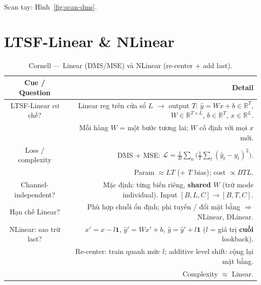 \documentclass[12pt,a4paper]{article}
\newcommand{\cornellhead}{%
  \toprule
  \textbf{Cue / Question} & \textbf{Detail} \\
  \midrule
}
\begin{document}
\noindent Scan tay: Hình~\ref{fig:scan-dms}.

\section{LTSF-Linear \& NLinear}

\begin{table}[H]
  \centering
  \caption{Cornell --- Linear (DMS/MSE) và NLinear (re-center + add last).}
  \label{tab:cornell-linear-nlinear}
  \small
  \begin{tabularx}{\textwidth}{@{}CD@{}}
    \cornellhead
    LTSF-Linear cơ chế?    &
    Linear reg trên cửa sổ \(L\) $\to$ output \(T\):
    \(\hat{y}=Wx+b\in\mathbb{R}^{T}\),
    \(W\in\mathbb{R}^{T\times L}\), \(b\in\mathbb{R}^{T}\), \(x\in\mathbb{R}^{L}\).                     \\
                           & Mỗi hàng \(W\) = một bước tương lai; \(W\) cố định với mọi \(x\) mới.      \\
    \addlinespace
    Loss / complexity      &
    DMS + MSE:
    \(\mathcal{L}=\frac{1}{B}\sum_n\bigl(\frac{1}{T}\sum_t(\hat{y}_t-y_t)^2\bigr)\).                    \\
                           & Param \(\approx LT\) (+ \(T\) bias); cost \(\propto BTL\).                 \\
    \addlinespace
    Channel-independent?   &
    Mặc định: từng biến riêng, \textbf{shared \(W\)}
    (trừ mode individual). Input \([B,L,C]\to[B,T,C]\).                                                 \\
    \addlinespace
    Hạn chế Linear?        &
    Phù hợp chuỗi ổn định; phi tuyến / đổi mặt bằng $\Rightarrow$ NLinear, DLinear.                     \\
    \addlinespace
    NLinear: sao trừ last? &
    \(x'=x-l\mathbf{1}\), \(\hat{y}'=Wx'+b\), \(\hat{y}=\hat{y}'+l\mathbf{1}\)
    (\(l\) = giá trị \textbf{cuối} lookback).                                                           \\
                           & Re-center: train quanh mức \(l\); additive level shift: cộng lại mặt bằng. \\
                           & Complexity \(\approx\) Linear.                                             \\
    \bottomrule
  \end{tabularx}
\end{table}
\end{document}
